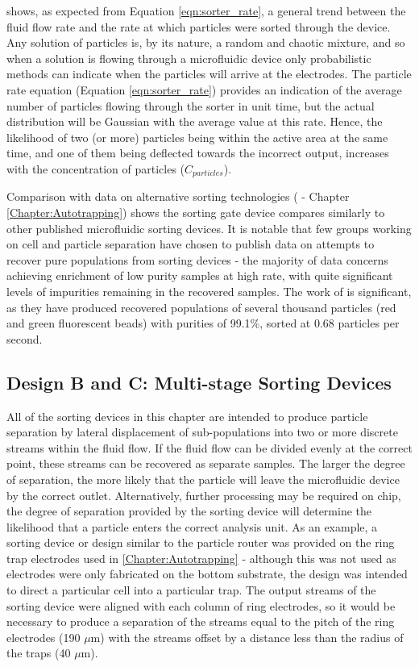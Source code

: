  shows, as expected from Equation \ref{eqn:sorter_rate}, a general trend between the fluid flow rate and the rate at which particles were sorted through the device. Any solution of particles is, by its nature, a random and chaotic mixture, and so when a solution is flowing through a microfluidic device only probabilistic methods can indicate when the particles will arrive at the electrodes. The particle rate equation (Equation \ref{eqn:sorter_rate}) provides an indication of the average number of particles flowing through the sorter in unit time, but the actual distribution will be Gaussian with the average value at this rate. Hence, the likelihood of two (or more) particles being within the active area at the same time, and one of them being deflected towards the incorrect output, increases with the concentration of particles ($C_{particles}$).

Comparison with data on alternative sorting technologies ( - Chapter \ref{Chapter:Autotrapping}) shows the sorting gate device compares similarly to other published microfluidic sorting devices. It is notable that few groups working on cell and particle separation have chosen to publish data on attempts to recover pure populations from sorting devices - the majority of data concerns achieving enrichment of low purity samples at high rate, with quite significant levels of impurities remaining in the recovered samples. The work of \cite{Dittrich:2003} is significant, as they have produced recovered populations of several thousand particles (red and green fluorescent beads) with purities of 99.1\%, sorted at 0.68 particles per second.


\subsection{Design B and C: Multi-stage Sorting Devices}
All of the sorting devices in this chapter are intended to produce particle separation by lateral displacement of sub-populations into two or more discrete streams within the fluid flow. If the fluid flow can be divided evenly at the correct point, these streams can be recovered as separate samples. The larger the degree of separation, the more likely that the particle will leave the microfluidic device by the correct outlet. Alternatively, further processing may be required on chip, the degree of separation provided by the sorting device will determine the likelihood that a particle enters the correct analysis unit. As an example, a sorting device or design similar to the particle router was provided on the ring trap electrodes used in \cref{Chapter:Autotrapping} - although this was not used as electrodes were only fabricated on the bottom substrate, the design was intended to direct a particular cell into a particular trap. The output streams of the sorting device were aligned with each column of ring electrodes, so it would be necessary to produce a separation of the streams equal to the pitch of the ring electrodes (190 $\mu$m) with the streams offset by a distance less than the radius of the traps (40 $\mu$m).

